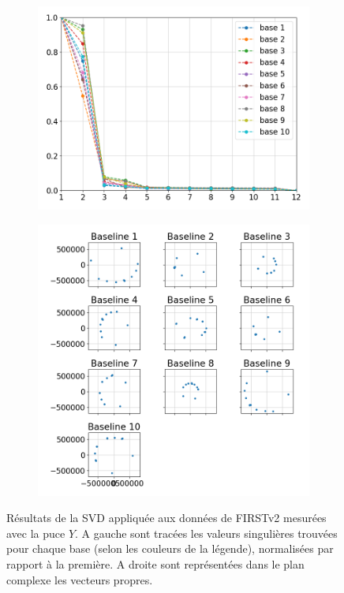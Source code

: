\begin{figure}[ht!]
    \begin{subfigure}{0.5\textwidth}
        \centering
        \includegraphics[width=\textwidth]{Figure_Chap3/20221010_SingValue_PolaBase_LaTex.png}
    \end{subfigure}%
    \begin{subfigure}{0.5\textwidth}
        \centering
        \includegraphics[width=\textwidth]{Figure_Chap3/20221010_ComplexVisibility_Pola1_Base_LaTex.png}
    \end{subfigure}
    \caption[Résultats de la SVD appliquée aux données de FIRSTv2 mesurées avec la puce $Y$.]{Résultats de la SVD appliquée aux données de FIRSTv2 mesurées avec la puce $Y$. A gauche sont tracées les valeurs singulières trouvées pour chaque base (selon les couleurs de la légende), normalisées par rapport à la première. A droite sont représentées dans le plan complexe les vecteurs propres.}
    \label{fig:SVD}
\end{figure}

